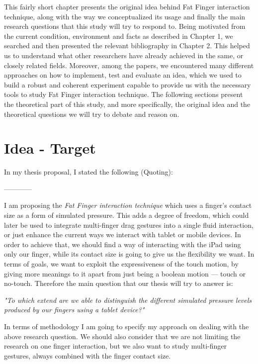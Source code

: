 
This fairly short chapter presents the original idea behind Fat Finger interaction technique, along with the way we conceptualized its usage and finally the main research questions that this study will try to respond to. Being motivated from the current condition, environment and facts as described in Chapter 1, we searched and then presented the relevant bibliography in Chapter 2. This helped us to understand what other researchers have already achieved in the same, or closely related fields. Moreover, among the papers, we encountered many different approaches on how to implement, test and evaluate an idea, which we used to build a robust and coherent experiment capable to provide us with the necessary tools to study Fat Finger interaction technique. The following sections present the theoretical part of this study, and more specifically, the original idea and the theoretical questions we will try to debate and reason on.

\section{Idea - Target}
In my thesis proposal, I stated the following (Quoting):

------------

I am proposing the \emph{Fat Finger interaction technique} which uses a finger's contact size as a form of simulated pressure. This adds a degree of freedom, which could later be used to integrate multi-finger drag gestures into a single fluid interaction, or just enhance the current ways we interact with tablet or mobile devices. In order to achieve that, we should find a way of interacting with the iPad using only our finger, while its contact size is going to give us the flexibility we want. In terms of goals, we want to exploit the expressiveness of the touch motion, by giving more meanings to it apart from just being a boolean motion --- touch or no-touch. Therefore the main question that our thesis will try to answer is:

\emph{"To which extend are we able to distinguish the different simulated pressure levels produced by our fingers using a tablet device?"}

In terms of methodology I am going to specify my approach on dealing with the above research question. We should also consider that we are not limiting the research on one finger interaction, but we also want to study multi-finger gestures, always combined with the finger contact size.


